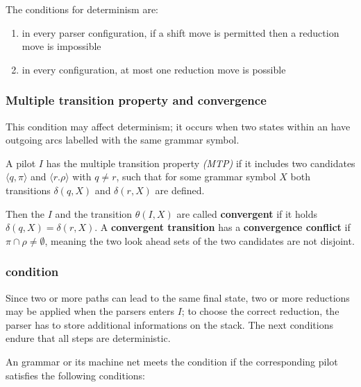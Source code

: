 \documentclass[english]{article}
\begin{document}
\bigskip
The conditions for determinism are:

\begin{enumerate}
  \item in every parser configuration, if a shift move is permitted then a reduction move is impossible
  \item in every configuration, at most one reduction move is possible
\end{enumerate}

\subsubsection{Multiple transition property and convergence}

This condition may affect determinism;
it occurs when two states within an \mstate have outgoing arcs labelled with the same grammar symbol.

\bigskip
A pilot \mstate \(I\) has the multiple transition property \textit{(MTP)} if it includes two candidates \(\langle q, \pi \rangle\) and \(\langle r. \rho\rangle\) with \(q \neq r\), such that for some grammar symbol \(X\) both transitions \(\delta(q, X)\) and \(\delta(r, X)\) are defined.

Then the \mstate \(I\) and the transition \(\theta(I, X)\) are called \textbf{convergent} if it holds \(\delta(q, X) = \delta(r, X)\).
A \textbf{convergent transition} has a \textbf{convergence conflict} if \(\pi \cap \rho \neq \emptyset\), meaning the two look ahead sets of the two candidates are not disjoint.

\subsubsection[ELR(1) condition]{\ELRo condition}
\label{sec:elro-condition}

Since two or more paths can lead to the same final state, two or more reductions may be applied when the parsers enters \mstate \(I\);
to choose the correct reduction, the parser has to store additional informations on the stack.
The next conditions endure that all steps are deterministic.

\bigskip
An \EBNF grammar or its machine net meets the condition \ELRo if the corresponding pilot satisfies the following conditions:
\end{document}
